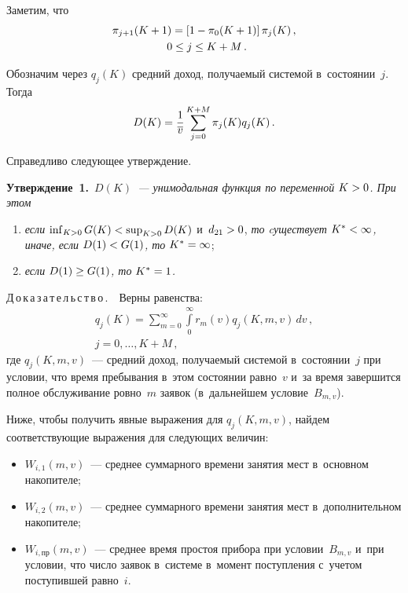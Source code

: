 \begin{multicols}{2}
  Заметим, что 
  \begin{multline}
  \pi_{j+1}(K+1)=\left[ 1-\pi_0(K+1)\right] \pi_j(K)\,,\\
  \enskip 0\leq j\leq K+M\,.
  \label{e4-aga}
  \end{multline}
  
  Обозначим через $q_j(K)$ средний доход, получаемый системой 
в~состоянии~$j$. Тогда
  \begin{equation}
  D(K)=\displaystyle\frac{\displaystyle 1\mathstrut}{\displaystyle \overline{v}\mathstrut} \sum\limits_{j=0}^{K+M} \pi_j(K) q_j(K)\,.
  \label{e5-aga}
  \end{equation}
  
  Справедливо следующее утверждение.
  
  \smallskip
  
  
  \noindent
  \textbf{Утверждение~1.}\ \textit{$D(K)$~--- унимодальная функция по 
переменной $K\hm>0$. При этом}
\begin{enumerate}[(1)]
\item \textit{если} $\mathop{\mathrm{inf}}\nolimits_{K>0} 
G(K)\hm< \mathop{\mathrm{sup}}\nolimits_{K>0} D(K)$ и~$d_{21}\hm>0$, \textit{то cуществует 
$K^*\hm<\infty$, иначе, если $D(1)\hm< G(1)$, то $K^*\hm=
  \infty$}; 
  \item \textit{если $D(1)\hm\geq G(1)$, то $K^*\hm=1$.}
  \end{enumerate}
  
  \smallskip
  
  \noindent
  Д\,о\,к\,а\,з\,а\,т\,е\,л\,ь\,с\,т\,в\,о\,.\ \ Верны равенства:
  \begin{multline}
q_j(K)=\sum\limits^\infty_{m=0} \int\limits_0^\infty r_m(v) q_j(K, m, v)\,dv\,,\\[-6pt]
  j=0,\ldots , K+M\,,
  \label{e6-aga}
  \end{multline}
где $q_j(K, m, v)$~--- средний доход, получаемый системой в~состоянии~$j$ 
при условии, что время пребывания в~этом состоянии равно~$v$ и~за время   
завершится полное обслуживание ровно~$m$ заявок (в~дальнейшем 
условие~$B_{m,v}$). 
  
  Ниже, чтобы получить явные выражения для $q_j(K,m,v)$, найдем 
соответствующие выражения для следующих величин: 
\begin{itemize}
\item $W_{i,1}(m,v)$~--- 
среднее суммарного времени занятия мест в~основном накопителе; 
\item $W_{i,2}(m,v)$~--- среднее суммарного времени занятия мест 
в~дополнительном накопителе; 
\item $W_{i,\mathrm{пр}}(m,v)$~--- среднее время 
простоя прибора при условии~$B_{m,v}$ и~при условии, что число заявок 
в~сис\-те\-ме в~момент поступления с~учетом поступившей равно~$i$.
\end{itemize}


\end{multicols}
